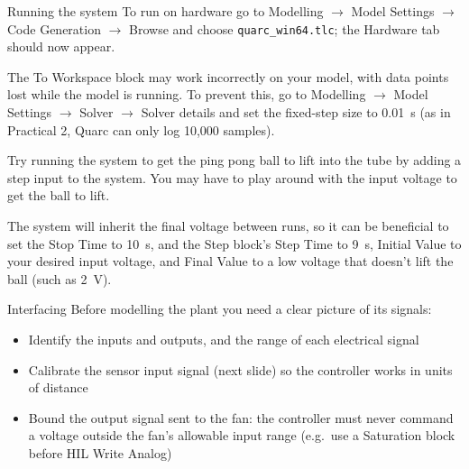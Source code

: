 \documentclass[9pt]{beamer-control}
\begin{document}
\begin{frame}{Running the system}
	To run on hardware go to \textsf{Modelling} $\to$ \textsf{Model Settings} $\to$ \textsf{Code Generation} $\to$ \textsf{Browse} and choose \texttt{quarc\_win64.tlc}; the \textsf{Hardware} tab should now appear.

	The \textsf{To Workspace} block may work incorrectly on your model, with data points lost while the model is running. To prevent this, go to \textsf{Modelling} $\to$ \textsf{Model Settings} $\to$ \textsf{Solver} $\to$ \textsf{Solver details} and set the fixed-step size to \qty{0.01}{s} (as in Practical 2, Quarc can only log 10,000 samples).

	Try running the system to get the ping pong ball to lift into the tube by adding a step input to the system. You may have to play around with the input voltage to get the ball to lift.

	The system will inherit the final voltage between runs, so it can be beneficial to set the \textsf{Stop Time} to \qty{10}{s}, and the \textsf{Step} block's \textsf{Step Time} to \qty{9}{s}, \textsf{Initial Value} to your desired input voltage, and \textsf{Final Value} to a low voltage that doesn't lift the ball (such as \qty{2}{V}).
\end{frame}


\begin{frame}{Interfacing}
Before modelling the plant you need a clear picture of its signals:
\begin{itemize}
\item Identify the inputs and outputs, and the range of each electrical signal
\item Calibrate the sensor input signal (next slide) so the controller works in units of distance
\item Bound the output signal sent to the fan: the controller must never command a voltage outside the fan's allowable input range (e.g.\ use a \textsf{Saturation} block before \textsf{HIL Write Analog})
\end{itemize}
\end{frame}
\end{document}
